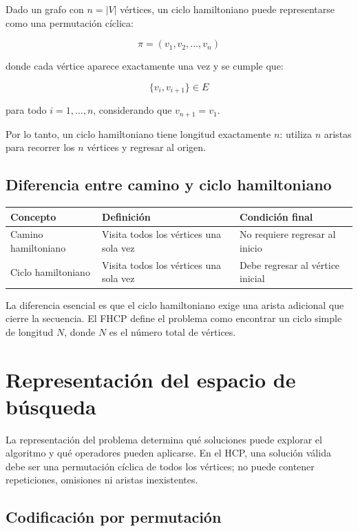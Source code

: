 \documentclass[12pt]{article}
\begin{document}
Dado un grafo con \(n=|V|\) vértices, un ciclo hamiltoniano puede representarse como una permutación cíclica:

\[
\pi=(v_1,v_2,\dots,v_n)
\]

donde cada vértice aparece exactamente una vez y se cumple que:

\[
\{v_i,v_{i+1}\}\in E
\]

para todo \(i=1,\dots,n\), considerando que \(v_{n+1}=v_1\).

Por lo tanto, un ciclo hamiltoniano tiene longitud exactamente \(n\): utiliza \(n\) aristas para recorrer los \(n\) vértices y regresar al origen. \cite{fhcp}

\subsection{Diferencia entre camino y ciclo hamiltoniano}

\begin{table}[h]
\centering
\begin{tabular}{lll}
\toprule
\textbf{Concepto} & \textbf{Definición} & \textbf{Condición final} \\
\midrule
Camino hamiltoniano & Visita todos los vértices una sola vez & No requiere regresar al inicio \\
Ciclo hamiltoniano & Visita todos los vértices una sola vez & Debe regresar al vértice inicial \\
\bottomrule
\end{tabular}
\end{table}

La diferencia esencial es que el ciclo hamiltoniano exige una arista adicional que cierre la secuencia. El FHCP define el problema como encontrar un ciclo simple de longitud \(N\), donde \(N\) es el número total de vértices. \cite{fhcp}

\section{Representación del espacio de búsqueda}

La representación del problema determina qué soluciones puede explorar el algoritmo y qué operadores pueden aplicarse. En el HCP, una solución válida debe ser una permutación cíclica de todos los vértices; no puede contener repeticiones, omisiones ni aristas inexistentes.

\subsection{Codificación por permutación}
\end{document}

